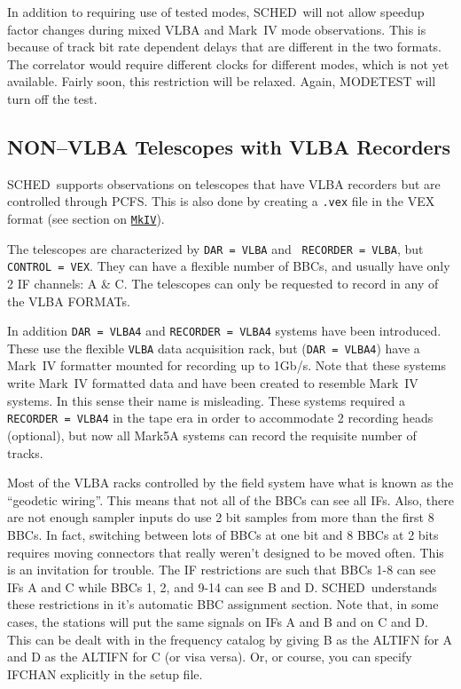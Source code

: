 \documentclass{report}
\newcommand{\schedb}{{\sc SCHED~}}
\begin{document}


In addition to requiring use of tested modes, \schedb will not
allow speedup factor changes during mixed VLBA and Mark~IV mode
observations.  This is because of track bit rate dependent delays that
are different in the two formats.  The correlator would require
different clocks for different modes, which is not yet available.
Fairly soon, this restriction will be relaxed.  Again, MODETEST will
turn off the test.

\subsection{\label{SSEC:FS9VLBA}NON--VLBA Telescopes with VLBA Recorders}

\schedb supports observations on telescopes that have VLBA
recorders but are controlled through PCFS. This is also done by
creating a {\tt *.vex} file in the VEX format (see section on
{\hyperref[SSEC:MKIV]{{\tt MkIV}}}).

The telescopes are characterized by {\tt DAR = VLBA} and {\tt
RECORDER = VLBA}, but {\tt CONTROL = VEX}. They can have a flexible
number of BBCs, and usually have only 2 IF channels: A \& C.
The telescopes can only be requested to record in any of the
VLBA FORMATs.

In addition {\tt DAR = VLBA4} and {\tt RECORDER = VLBA4} systems have
been introduced. These use the flexible {\tt VLBA} data acquisition
rack, but ({\tt DAR = VLBA4}) have a Mark~IV formatter mounted for
recording up to 1Gb/s.  Note that these systems write Mark~IV
formatted data and have been created to resemble Mark~IV systems. In
this sense their name is misleading.  These systems required a {\tt
RECORDER = VLBA4} in the tape era in order to accommodate 2 recording
heads (optional), but now all Mark5A systems can record the requisite
number of tracks.

Most of the VLBA racks controlled by the field system have what is
known as the ``geodetic wiring''.  This means that not all of the
BBCs can see all IFs.  Also, there are not enough sampler inputs do
use 2 bit samples from more than the first 8 BBCs.  In fact, switching
between lots of BBCs at one bit and 8 BBCs at 2 bits requires moving
connectors that really weren't designed to be moved often.  This is
an invitation for trouble.  The IF restrictions are such that
BBCs 1-8 can see IFs A and C while BBCs 1, 2, and 9-14 can see B and D.
\schedb understands these restrictions in it's automatic BBC assignment
section.  Note that, in some cases, the stations will put the same
signals on IFs A and B and on C and D.  This can be dealt with in the
frequency catalog by giving B as the ALTIFN for A and D as the ALTIFN
for C (or visa versa).  Or, or course, you can specify IFCHAN explicitly
in the setup file.
\end{document}
